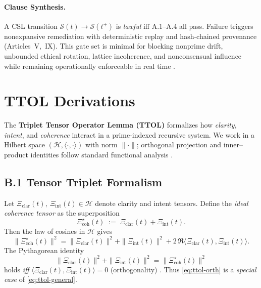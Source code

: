 \documentclass[12pt]{amsart}
\theoremstyle{plain}
\begin{document}
\paragraph{Clause Synthesis.}
A CSL transition $\mathcal{S}(t)\!\to\!\mathcal{S}(t^+)$ is \emph{lawful} iff A.1–A.4 all pass. Failure triggers nonexpansive remediation with deterministic replay and hash-chained provenance (Articles~V,~IX). This gate set is minimal for blocking nonprime drift, unbounded ethical rotation, lattice incoherence, and nonconsensual influence while remaining operationally enforceable in real time \cite{schneider2000enforceable,clarke1999model,baier2008model}.


\clearpage

\section{TTOL Derivations}

\noindent The \textbf{Triplet Tensor Operator Lemma (TTOL)} formalizes how \emph{clarity}, \emph{intent}, and \emph{coherence} interact in a prime-indexed recursive system. We work in a Hilbert space $(\mathcal{H},\langle\cdot,\cdot\rangle)$ with norm $\|\cdot\|$; orthogonal projection and inner–product identities follow standard functional analysis \cite{rudin1991functional,conway1990functional,lax2002functional}.

\subsection*{B.1 Tensor Triplet Formalism}
Let $\Xi_{\mathrm{clar}}(t),\ \Xi_{\mathrm{int}}(t)\in\mathcal{H}$ denote clarity and intent tensors. Define the \emph{ideal coherence tensor} as the superposition
\[
\Xi_{\mathrm{coh}}^{\star}(t)\;:=\;\Xi_{\mathrm{clar}}(t)+\Xi_{\mathrm{int}}(t).
\]
Then the law of cosines in $\mathcal{H}$ gives
\begin{equation}
\|\Xi_{\mathrm{coh}}^{\star}(t)\|^{2}
=\|\Xi_{\mathrm{clar}}(t)\|^{2}+\|\Xi_{\mathrm{int}}(t)\|^{2}
+2\,\Re\langle \Xi_{\mathrm{clar}}(t),\Xi_{\mathrm{int}}(t)\rangle.
\label{eq:ttol-general}
\end{equation}
The Pythagorean identity
\begin{equation}
\|\Xi_{\mathrm{clar}}(t)\|^{2}+\|\Xi_{\mathrm{int}}(t)\|^{2}
=\|\Xi_{\mathrm{coh}}^{\star}(t)\|^{2}
\label{eq:ttol-orth}
\end{equation}
holds \emph{iff} $\langle \Xi_{\mathrm{clar}}(t),\Xi_{\mathrm{int}}(t)\rangle=0$ (orthogonality) \cite{rudin1991functional,lax2002functional}. Thus \eqref{eq:ttol-orth} is a \emph{special case} of \eqref{eq:ttol-general}.
\end{document}

